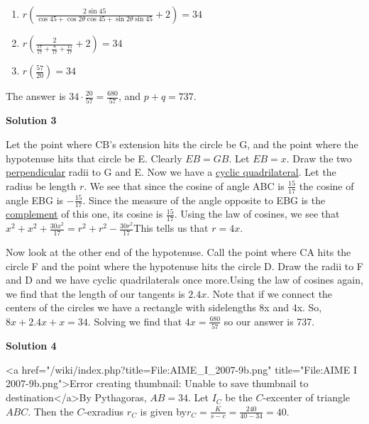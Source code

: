 \begin{enumerate}
 
            \begin{enumerate}[label=(\roman*)]
                \item $r\left(\frac{2 \sin 45}{\cos 45 + \cos 2\theta \cos 45 + \sin 2\theta \sin 45} +2\right) = 34$\item $r\left(\frac{2}{\frac{17}{17} + \frac{8}{17} + \frac{15}{17}} + 2\right) = 34$\item $r\left(\frac{57}{20}\right) = 34$
            \end{enumerate}
            The answer is $34 \cdot \frac{20}{57} = \frac{680}{57}$, and $p + q = 737$.

 



\textbf{Solution 3}

Let the point where CB's extension hits the circle be G, and the point where the hypotenuse hits that circle be E. Clearly $EB=GB$. Let $EB=x$. Draw the two \href{https://artofproblemsolving.com/wiki/index.php?title=Perpendicular}{perpendicular} radii to G and E. Now we have a \href{https://artofproblemsolving.com/wiki/index.php?title=Cyclic\_quadrilateral}{cyclic quadrilateral}. Let the radius be length $r$. We see that since the cosine of angle ABC is $\frac{15}{17}$ the cosine of angle EBG is $-\frac{15}{17}$. Since the measure of the angle opposite to EBG is the \href{https://artofproblemsolving.com/wiki/index.php?title=Complement}{complement} of this one, its cosine is $\frac{15}{17}$. Using the law of cosines, we see that $x^{2}+x^{2}+\frac{30x^{2}}{17}=r^{2}+r^{2}-\frac{30r^{2}}{17}$This tells us that $r=4x$.

 Now look at the other end of the hypotenuse. Call the point where CA hits the circle F and the point where the hypotenuse hits the circle D. Draw the radii to F and D and we have cyclic quadrilaterals once more.Using the law of cosines again, we find that the length of our tangents is $2.4x$. Note that if we connect the centers of the circles we have a rectangle with sidelengths 8x and 4x. So, $8x+2.4x+x=34$. Solving we find that $4x=\frac{680}{57}$ so our answer is 737.

 



\textbf{Solution 4}

<a href="/wiki/index.php?title=File:AIME\_I\_2007-9b.png" title="File:AIME I 2007-9b.png">Error creating thumbnail: Unable to save thumbnail to destination</a>By Pythagoras, $AB = 34$.  Let $I_{C}$ be the $C$-excenter of triangle $ABC$.  Then the $C$-exradius $r_{C}$ is given by$r_{C}= \frac{K}{s-c}= \frac{240}{40-34}= 40$.


\end{enumerate}
